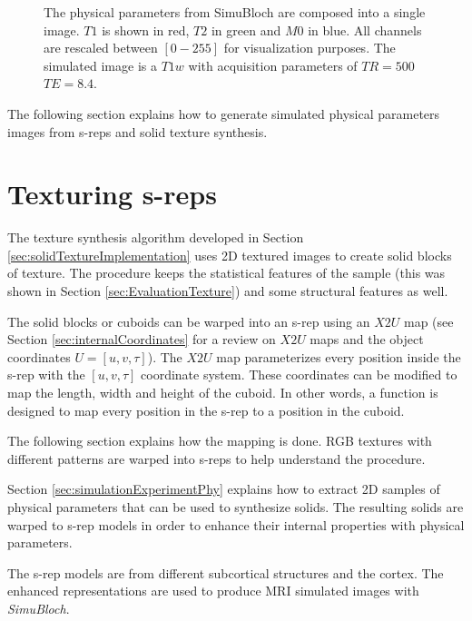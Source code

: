 \begin{figure}
 \centering    
 \caption[\textit{SimuBloch} physical parameters.]{The physical parameters from SimuBloch are composed into a single image. $T1$ is shown in red, $T2$ in green and $M0$ in blue. 
	    All channels are rescaled between $[0-255]$ for visualization purposes.
	    The simulated image is a $T1w$ with acquisition parameters of $TR=500$ $TE=8.4$.
	    }
 \label{fig:simuBlocPhysical}  
\end{figure}


The following section explains how to generate simulated physical parameters images from s-reps 
and solid texture synthesis.


\section{Texturing s-reps}
\label{sec:simulationExperiment}

The texture synthesis algorithm developed in Section \ref{sec:solidTextureImplementation} 
uses 2D textured images to create solid blocks of texture.
The procedure keeps the statistical features of the sample (this was shown in Section \ref{sec:EvaluationTexture})
and some structural features as well.

The solid blocks or cuboids can be warped into an s-rep using an $X2U$ map (see Section \ref{sec:internalCoordinates} for a review on $X2U$ maps and 
the object coordinates $U = [u, v, \tau]$).
The $X2U$ map parameterizes every position inside the s-rep with the $[u, v, \tau]$ coordinate system. 
These coordinates can be modified to map the length, width and height of the cuboid. 
In other words, a function is designed to map every position 
in the s-rep to a position in the cuboid.

The following section explains how the mapping is done.
RGB textures with different patterns are warped 
into s-reps to help understand the procedure.

Section \ref{sec:simulationExperimentPhy} explains how to 
extract 2D samples of physical parameters
that can be used to synthesize solids. 
The resulting solids
are warped to s-rep models in order
to enhance their internal properties
with physical parameters.

The s-rep models are from different subcortical 
structures and the cortex. 
The enhanced representations are used to produce MRI simulated images with \textit{SimuBloch}.

